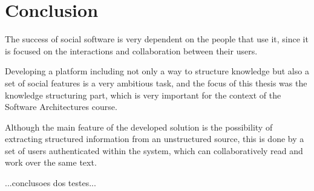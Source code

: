 
\chapter{Conclusion}
\label{chapter:conclusion}

The success of social software is very dependent on the people that use it, since it is focused on the interactions and collaboration between their users.

Developing a platform including not only a way to structure knowledge but also a set of social features is a very ambitious task, and the focus of this thesis was the knowledge structuring part, which is very important for the context of the Software Architectures course.

Although the main feature of the developed solution is the possibility of extracting structured information from an unstructured source, this is done by a set of users authenticated within the system, which can collaboratively read and work over the same text.

...conclusoes dos testes...



